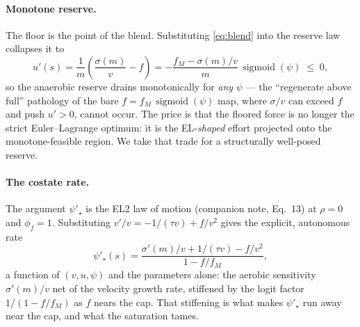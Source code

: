 \documentclass[11pt]{article}
\DeclareMathOperator{\sigmoid}{sigmoid}
\begin{document}
\paragraph{Monotone reserve.} The floor is the point of the blend. Substituting \eqref{eq:blend} into the reserve law collapses it to
\begin{equation}\label{eq:umono}
u'(s) = \frac{1}{m}\left(\frac{\sigma(m)}{v} - f\right) = -\frac{f_M - \sigma(m)/v}{m}\,\sigmoid(\psi) \;\leq\; 0,
\end{equation}
so the anaerobic reserve drains monotonically for \emph{any} $\psi$ --- the ``regenerate above full'' pathology of the bare $f = f_M\,\sigmoid(\psi)$ map, where $\sigma/v$ can exceed $f$ and push $u' > 0$, cannot occur. The price is that the floored force is no longer the strict Euler--Lagrange optimum: it is the EL-\emph{shaped} effort projected onto the monotone-feasible region. We take that trade for a structurally well-posed reserve.

\paragraph{The costate rate.} The argument $\psi'_\star$ is the EL2 law of motion (companion note, Eq.~13) at $\rho = 0$ and $\phi_f = 1$. Substituting $v'/v = -1/(\tau v) + f/v^2$ gives the explicit, autonomous rate
\begin{equation}\label{eq:psistar-explicit}
\psi'_\star(s) = \frac{\sigma'(m)/v + 1/(\tau v) - f/v^2}{1 - f/f_M},
\end{equation}
a function of $(v, u, \psi)$ and the parameters alone: the aerobic sensitivity $\sigma'(m)/v$ net of the velocity growth rate, stiffened by the logit factor $1/(1 - f/f_M)$ as $f$ nears the cap. That stiffening is what makes $\psi'_\star$ run away near the cap, and what the saturation tames.
\end{document}
